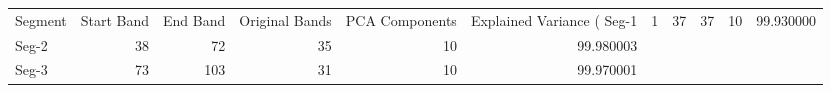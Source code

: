 \begin{tabular}{lrrrrr}
\toprule
Segment & Start Band & End Band & Original Bands & PCA Components & Explained Variance (%
\midrule
Seg-1 & 1 & 37 & 37 & 10 & 99.930000 \\
Seg-2 & 38 & 72 & 35 & 10 & 99.980003 \\
Seg-3 & 73 & 103 & 31 & 10 & 99.970001 \\
\bottomrule
\end{tabular}
